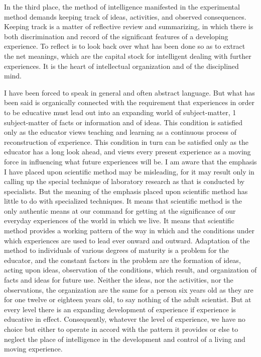 In the third place, the method of intelligence manifested in the experimental method 
demands keeping track of ideas, activities, and observed consequences. Keeping track is 
a matter of reflective review and summarizing, in which there is both discrimination and 
record of the significant features of a developing experience. To reflect is to look back 
over what has been done so as to extract the net meanings, which are the capital stock for intelligent dealing with further experiences. It is the heart of intellectual organization and 
of the disciplined mind. 

I have been forced to speak in general and often abstract language. But what has been 
said is organically connected with the requirement that experiences in order to be 
educative must lead out into an expanding world of subject-matter, 1 subject-matter of 
facts or information and of ideas. This condition is satisfied only as the educator views 
teaching and learning as a continuous process of reconstruction of experience. This 
condition in turn can be satisfied only as the educator has a long look ahead, and views 
every present experience as a moving force in influencing what future experiences will 
be. I am aware that the emphasis I have placed upon scientific method may be 
misleading, for it may result only in calling up the special technique of laboratory 
research as that is conducted by specialists. But the meaning of the emphasis placed upon 
scientific method has little to do with specialized techniques. It means that scientific 
method is the only authentic means at our command for getting at the significance of our 
everyday experiences of the world in which we live. It means that scientific method 
provides a working pattern of the way in which and the conditions under which 
experiences are used to lead ever onward and outward. Adaptation of the method to 
individuals of various degrees of maturity is a problem for the educator, and the constant 
factors in the problem are the formation of ideas, acting upon ideas, observation of the 
conditions, which result, and organization of facts and ideas for future use. Neither the 
ideas, nor the activities, nor the observations, the organization are the same for a person 
six years old as they are for one twelve or eighteen years old, to say nothing of the adult 
scientist. But at every level there is an expanding development of experience if 
experience is educative in effect. Consequently, whatever the level of experience, we 
have no choice but either to operate in accord with the pattern it provides or else to 
neglect the place of intelligence in the development and control of a living and moving 
experience. 